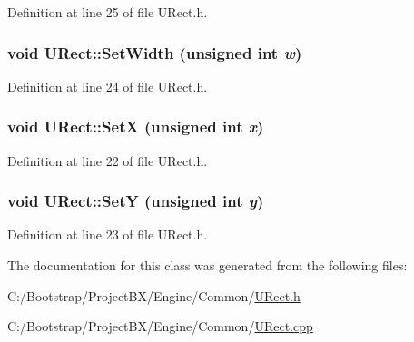Definition at line 25 of file URect.h.\hypertarget{class_u_rect_f63bae9c27394d9dbc7b3e1b8e48c20b}{
\subsubsection[{SetWidth}]{\setlength{\rightskip}{0pt plus 5cm}void URect::SetWidth (unsigned int {\em w})}}
\label{class_u_rect_f63bae9c27394d9dbc7b3e1b8e48c20b}




Definition at line 24 of file URect.h.\hypertarget{class_u_rect_e19515cfb7872b5b27bede7f489a520c}{
\subsubsection[{SetX}]{\setlength{\rightskip}{0pt plus 5cm}void URect::SetX (unsigned int {\em x})}}
\label{class_u_rect_e19515cfb7872b5b27bede7f489a520c}




Definition at line 22 of file URect.h.\hypertarget{class_u_rect_53c87d408173afc96a8f60aa300527a0}{
\subsubsection[{SetY}]{\setlength{\rightskip}{0pt plus 5cm}void URect::SetY (unsigned int {\em y})}}
\label{class_u_rect_53c87d408173afc96a8f60aa300527a0}




Definition at line 23 of file URect.h.

The documentation for this class was generated from the following files:\begin{CompactItemize}
\item 
C:/Bootstrap/ProjectBX/Engine/Common/\hyperlink{_u_rect_8h}{URect.h}\item 
C:/Bootstrap/ProjectBX/Engine/Common/\hyperlink{_u_rect_8cpp}{URect.cpp}\end{CompactItemize}
